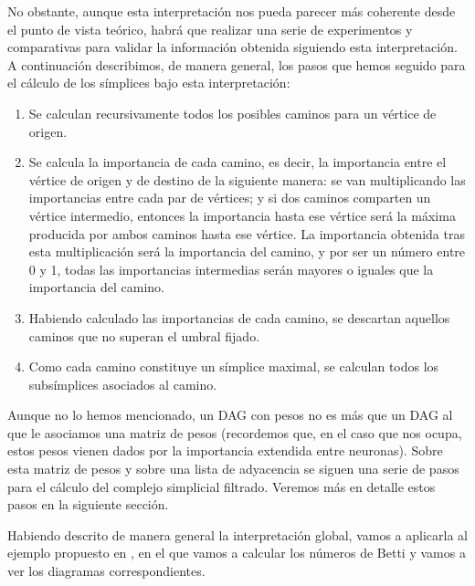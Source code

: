 \documentclass[12pt, a4paper, twoside]{book}
\numberwithin{equation}{section}
\theoremstyle{definition}
\theoremstyle{remark}
\theoremstyle{plain}
\begin{document}
	No obstante, aunque esta interpretación nos pueda parecer más 
	coherente desde el punto de vista teórico, habrá que realizar una 
	serie de experimentos y comparativas para validar la información 
	obtenida siguiendo esta interpretación. A continuación describimos, de
	manera general, los pasos que hemos seguido para el cálculo de los 
	símplices bajo esta interpretación: 

	\begin{enumerate}[label=\arabic*)]
		\item Se calculan recursivamente todos los posibles caminos 
			para un vértice de origen. 
		\item Se calcula la importancia de cada camino, es decir, la 
			importancia entre el vértice de origen y de destino de 
			la siguiente manera: se van multiplicando las 
			importancias entre cada par de vértices; y si dos 
			caminos comparten un vértice intermedio, entonces la 
			importancia hasta ese vértice será la máxima producida 
			por ambos caminos hasta ese vértice. La importancia 
			obtenida tras esta multiplicación será la importancia 
			del camino, y por ser un número entre 0 y 1, todas las
			importancias intermedias serán mayores o iguales que 
			la importancia del camino.
		\item Habiendo calculado las importancias de cada camino, se 
			descartan aquellos caminos que no superan el
			umbral fijado.
		\item Como cada camino constituye un símplice maximal, se 
			calculan todos los subsímplices
			asociados al camino.
	\end{enumerate}

	Aunque no lo hemos mencionado, un DAG con pesos no es más que un DAG
	al que le asociamos una matriz de pesos (recordemos que, en el caso 
	que nos ocupa, estos pesos vienen dados por la importancia extendida 
	entre neuronas). Sobre esta matriz de pesos y sobre una lista de 
	adyacencia se siguen una serie de pasos para el cálculo del complejo 
	simplicial filtrado. Veremos más en detalle estos pasos en la 
	siguiente sección. 

	Habiendo descrito de manera general la interpretación global, vamos a 
	aplicarla al ejemplo propuesto en \cite{Articulo-Watanabe}, en el que 
	vamos a calcular los números de Betti y vamos a ver los diagramas 
	correspondientes.
\end{document}
